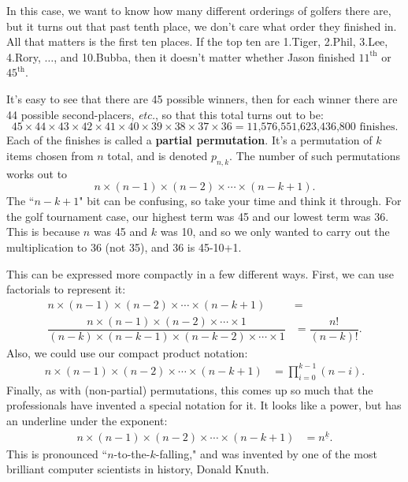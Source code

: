 In this case, we want to know how many different orderings of golfers there
are, but it turns out that past tenth place, we don't care what order they
finished in. All that matters is the first ten places. If the top ten are
1.Tiger, 2.Phil, 3.Lee, 4.Rory, $\dots$, and 10.Bubba, then it doesn't
matter whether Jason finished $11^{\text{th}}$ or $45^{\text{th}}$.

It's easy to see that there are 45 possible winners, then for each winner
there are 44 possible second-placers, \textit{etc.}, so that this total
turns out to be:
{\small
\[
45 \times 44 \times 43 \times 42 \times 41 \times 40 \times 39 \times 38
\times 37 \times 36 = \text{11,576,551,623,436,800 finishes}.
\]
}
Each of the finishes is called a \textbf{partial permutation}. It's a
permutation of $k$ items chosen from $n$ total, and is denoted $p_{n,k}$.
The number of such permutations works out to
\[
n \times (n-1) \times (n-2) \times \cdots \times (n-k+1).
\]
The ``$n-k+1$" bit can be confusing, so take your time and think it
through. For the golf tournament case, our highest term was 45 and our
lowest term was 36. This is because $n$ was 45 and $k$ was 10, and so we
only wanted to carry out the multiplication to 36 (not 35), and 36 is
45-10+1.

This can be expressed more compactly in a few different ways. First,
we can use factorials to represent it:
\begin{align*}
n \times (n-1) \times (n-2) \times \cdots \times (n-k+1) &= \\
\dfrac{n \times (n-1) \times (n-2) \times \cdots \times 1}{(n-k) \times (n-k-1) \times (n-k-2) \times \cdots \times 1} &= \dfrac{n!}{(n-k)!}.
\end{align*}
Also, we could use our compact product notation:
\begin{align*}
n \times (n-1) \times (n-2) \times \cdots \times (n-k+1) &= 
\prod_{i=0}^{k-1}{(n-i)}.
\end{align*}
Finally, as with (non-partial) permutations, this comes up so much that
the professionals have invented a special notation for it. It looks like a
power, but has an underline under the exponent:
\begin{align*}
n \times (n-1) \times (n-2) \times \cdots \times (n-k+1) &= 
n^{\underline{k}}.
\end{align*}
This is pronounced ``$n$-to-the-$k$-falling," and was invented by one of
the most brilliant computer scientists in history, Donald Knuth.

